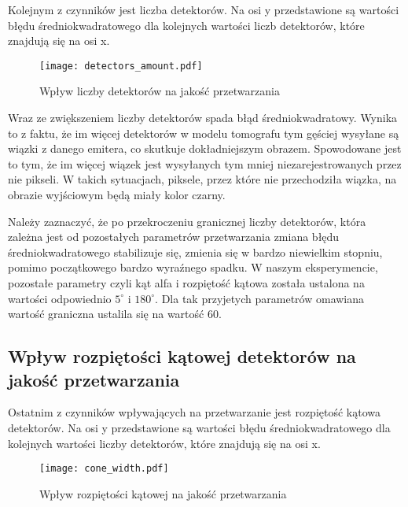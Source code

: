 \documentclass{article}
\begin{document}
Kolejnym z czynników jest liczba detektorów. Na osi y przedstawione są wartości błędu średniokwadratowego dla kolejnych wartości liczb detektorów, które znajdują się na osi x. 

\begin{figure}[!htbp]
\begin{center}
\texttt{[image: detectors\_amount.pdf]}
\end{center}
\caption{Wpływ liczby detektorów na jakość przetwarzania}
\label{fig:detectors_amount}
\end{figure}

Wraz ze zwiększeniem liczby detektorów spada błąd średniokwadratowy. Wynika to z faktu, że im więcej detektorów w modelu tomografu tym gęściej wysyłane są wiązki z danego emitera, co skutkuje dokładniejszym obrazem. Spowodowane jest to tym, że im więcej wiązek jest wysyłanych tym mniej niezarejestrowanych przez nie pikseli. W takich sytuacjach, piksele, przez które nie przechodziła wiązka, na obrazie wyjściowym będą miały kolor czarny.

Należy zaznaczyć, że po przekroczeniu granicznej liczby detektorów, która zależna jest od pozostałych parametrów przetwarzania zmiana błędu średniokwadratowego stabilizuje się, zmienia się w bardzo niewielkim stopniu, pomimo początkowego bardzo wyraźnego spadku.
W naszym eksperymencie, pozostałe parametry czyli kąt alfa i rozpiętość kątowa została ustalona na wartości odpowiednio $5 ^{\circ}$ i $180 ^{\circ}$. Dla tak przyjetych parametrów omawiana wartość graniczna ustalila się na wartość 60. 

\subsection{Wpływ rozpiętości kątowej detektorów na jakość przetwarzania}
\label{subsec_cone_width_comparison}

Ostatnim z czynników wpływających na przetwarzanie jest rozpiętość kątowa detektorów. Na osi y przedstawione są wartości błędu średniokwadratowego dla kolejnych wartości liczby detektorów, które znajdują się na osi x.

\begin{figure}[!htbp]
\begin{center}
\texttt{[image: cone\_width.pdf]}
\end{center}
\caption{Wpływ rozpiętości kątowej na jakość przetwarzania}
\label{fig:cone_width}
\end{figure}
\end{document}
